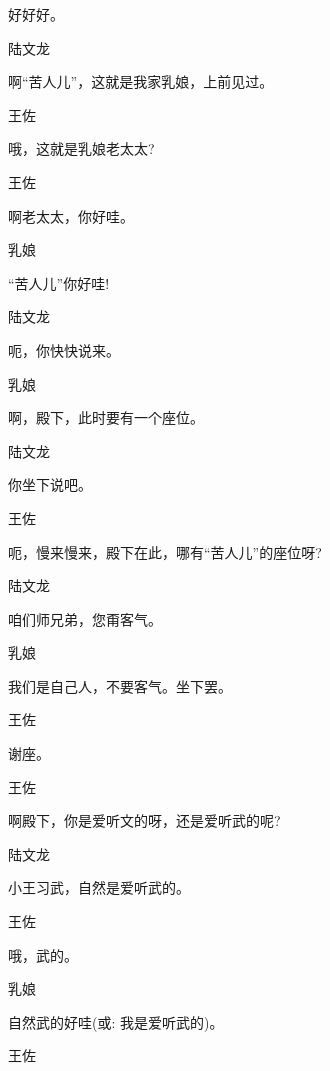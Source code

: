 {{{好好好。}

{陆文龙\hspace{20pt}~

啊``苦人儿''，这就是我家乳娘，上前见过。}

{王佐\hspace{30pt}~

哦，这就是乳娘老太太?}

{王佐\hspace{30pt}~

啊老太太，你好哇。}

{乳娘\hspace{30pt}~

``苦人儿''你好哇!}

{陆文龙\hspace{20pt}~

呃，你快快说来。}

{乳娘\hspace{30pt}~

啊，殿下，此时要有一个座位。}

{陆文龙\hspace{20pt}~

你坐下说吧。}

{王佐\hspace{30pt}~

呃，慢来慢来，殿下在此，哪有``苦人儿''的座位呀?}

{陆文龙\hspace{20pt}~

咱们师兄弟，您甭客气。}

{乳娘\hspace{30pt}~

我们是自己人，不要客气。坐下罢。}

{王佐\hspace{30pt}~

谢座。}

{王佐\hspace{30pt}~

啊殿下，你是爱听文的呀，还是爱听武的呢?}

{陆文龙\hspace{20pt}~

小王习武，自然是爱听武的。}

{王佐\hspace{30pt}~

哦，武的。}

{乳娘\hspace{30pt}~

自然武的好哇({\akai 或}: 我是爱听武的)。}

{王佐\hspace{30pt}~

}}}
